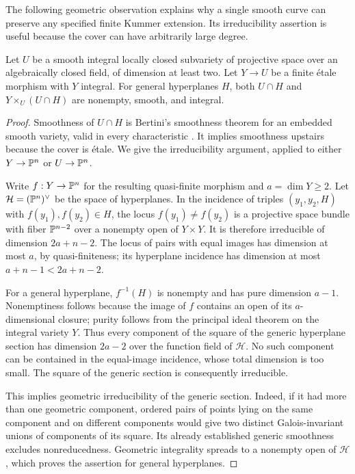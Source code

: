 The following geometric observation explains why a single smooth curve
can preserve any specified finite Kummer extension.  Its irreducibility
assertion is useful because the cover can have arbitrarily large degree.

\begin{lemma}\label{lem:support-bertini}
Let $U$ be a smooth integral locally closed subvariety of projective space
over an algebraically closed field, of dimension at least two.  Let
$Y\to U$ be a finite \'{e}tale morphism with $Y$ integral.
For general hyperplanes $H$, both $U\cap H$ and
$Y\times_U(U\cap H)$ are nonempty, smooth, and integral.
\end{lemma}

\begin{proof}
Smoothness of $U\cap H$ is Bertini's smoothness theorem for an embedded
smooth variety, valid in every characteristic
\cite[Lemma~33.47.3, Tag~0FD6]{Stacks}.  It implies smoothness
upstairs because the cover is \'{e}tale.  We give the irreducibility
argument, applied to either $Y\to\mathbb P^n$ or $U\to\mathbb P^n$.

Write $f:Y\to\mathbb P^n$ for the resulting quasi-finite morphism and
$a=\dim Y\ge2$.  Let $\mathcal H=(\mathbb P^n)^\vee$ be the space of
hyperplanes.  In the incidence of triples $(y_1,y_2,H)$ with
$f(y_1),f(y_2)\in H$, the locus $f(y_1)\ne f(y_2)$ is a projective
space bundle with fiber $\mathbb P^{n-2}$ over a nonempty open of $Y\times Y$.
It is therefore irreducible of dimension $2a+n-2$.
The locus of pairs with equal images has dimension at most $a$, by
quasi-finiteness; its hyperplane incidence has dimension at most
$a+n-1<2a+n-2$.

For a general hyperplane, $f^{-1}(H)$ is nonempty and has pure dimension
$a-1$.  Nonemptiness follows because the image of $f$ contains an open
of its $a$-dimensional closure; purity follows from the principal ideal
theorem on the integral variety $Y$.  Thus every component of the square
of the generic hyperplane section has dimension $2a-2$ over the function
field of $\mathcal H$.  No such component can be contained in the
equal-image incidence, whose total dimension is too small.  The square
of the generic section is consequently irreducible.

This implies geometric irreducibility of the generic section.  Indeed,
if it had more than one geometric component, ordered pairs of points
lying on the same component and on different components would give two
distinct Galois-invariant unions of components of its square.
Its already established generic smoothness excludes nonreducedness.
Geometric integrality spreads to a nonempty open of $\mathcal H$,
which proves the assertion for general hyperplanes.
\end{proof}

